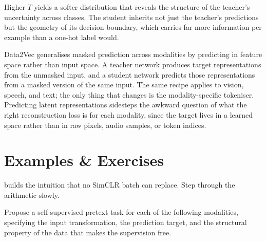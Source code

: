 Higher $T$ yields a softer distribution that reveals the structure of the teacher's uncertainty across classes.
The student inherits not just the teacher's predictions but the geometry of its decision boundary, which carries far more information per example than a one-hot label would.

\vspace{1.5em}

\cite{Baevski2022Data2Vec}
Data2Vec generalises masked prediction across modalities by predicting in feature space rather than input space.
A teacher network produces target representations from the unmasked input, and a student network predicts those representations from a masked version of the same input.
The same recipe applies to vision, speech, and text; the only thing that changes is the modality-specific tokeniser.
Predicting latent representations sidesteps the awkward question of what the right reconstruction loss is for each modality, since the target lives in a learned space rather than in raw pixels, audio samples, or token indices.




\newpage

\section{Examples \& Exercises}


 builds the intuition that no SimCLR batch can replace.
Step through the arithmetic slowly.

\vspace{1em}

Propose a self-supervised pretext task for each of the following modalities, specifying the input transformation, the prediction target, and the structural property of the data that makes the supervision free.


